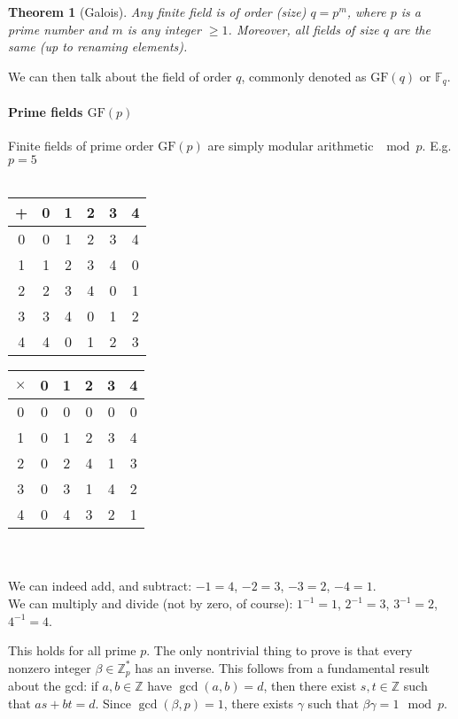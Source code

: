 \documentclass[a4paper, 11pt, openany]{book}
\numberwithin{equation}{section}
\theoremstyle{plain}
\newtheorem{theorem}	[equation]	{Theorem}
\theoremstyle{definition}
\newcommand{\GF}{\mathrm{GF}}
\newcommand{\Z}{\mathbb{Z}}
\begin{document}
\begin{theorem}[Galois] Any finite field is of order (size) $q = p^m$, where $p$ is a prime number and $m$ is any integer $\ge 1$. Moreover, all fields of size $q$ are the same (up to renaming elements).
\end{theorem}

We can then talk about the field of order $q$, commonly denoted as $\GF(q)$ or $\mathbb{F}_q$.



\paragraph{Prime fields $\GF(p)$} 
Finite fields of prime order $\GF(p)$ are simply modular arithmetic $\mod p$. E.g. $p=5$\\
~\\
\begin{tabular}{c|ccccc}
	+ & 0 & 1 & 2 & 3 & 4\\
	\hline
	0 & 0 & 1 & 2 & 3 & 4\\
	1 & 1 & 2 & 3 & 4 & 0\\
	2 & 2 & 3 & 4 & 0 & 1\\
	3 & 3 & 4 & 0 & 1 & 2\\
	4 & 4 & 0 & 1 & 2 & 3
\end{tabular} \hspace{2cm}
\begin{tabular}{c|ccccc}
	$\times$ & 0 & 1 & 2 & 3 & 4\\
	\hline
	0 & 0 & 0 & 0 & 0 & 0\\
	1 & 0 & 1 & 2 & 3 & 4\\
	2 & 0 & 2 & 4 & 1 & 3\\
	3 & 0 & 3 & 1 & 4 & 2\\
	4 & 0 & 4 & 3 & 2 & 1
\end{tabular}
~\\
~\\
We can indeed add, and subtract: $-1 = 4$, $-2 = 3$, $-3 = 2$, $-4 = 1$.\\
We can multiply and divide (not by zero, of course): $1^{-1} = 1$, $2^{-1} = 3$, $3^{-1} = 2$, $4^{-1} = 4$.

This holds for all prime $p$. The only nontrivial thing to prove is that every nonzero integer $\beta \in \Z_p^*$ has an inverse. This follows from a fundamental result about the gcd: if $a,b \in \Z$ have $\gcd(a,b) = d$, then there exist $s, t \in \Z$ such that $as + bt = d$. Since $\gcd(\beta, p) = 1$, there exists $\gamma$ such that $\beta \gamma = 1 \mod p$.
\end{document}

